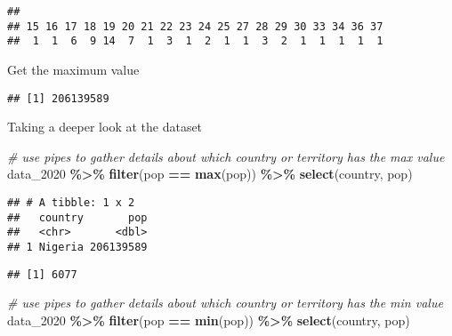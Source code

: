 \documentclass[
]{article}
\newenvironment{Shaded}{\begin{snugshade}}{\end{snugshade}}
\newcommand{\CommentTok}[1]{\textcolor[rgb]{0.56,0.35,0.01}{\textit{#1}}}
\newcommand{\FunctionTok}[1]{\textcolor[rgb]{0.13,0.29,0.53}{\textbf{#1}}}
\newcommand{\NormalTok}[1]{#1}
\newcommand{\SpecialCharTok}[1]{\textcolor[rgb]{0.81,0.36,0.00}{\textbf{#1}}}
\begin{document}
\begin{verbatim}
## 
## 15 16 17 18 19 20 21 22 23 24 25 27 28 29 30 33 34 36 37 
##  1  1  6  9 14  7  1  3  1  2  1  1  3  2  1  1  1  1  1
\end{verbatim}

Get the maximum value

\begin{Shaded}
\end{Shaded}

\begin{verbatim}
## [1] 206139589
\end{verbatim}

Taking a deeper look at the dataset

\begin{Shaded}
\begin{Highlighting}[]
\CommentTok{\# use pipes to gather details about which country or territory has the max value}
\NormalTok{data\_2020 }\SpecialCharTok{\%\textgreater{}\%} 
  \FunctionTok{filter}\NormalTok{(pop }\SpecialCharTok{==} \FunctionTok{max}\NormalTok{(pop)) }\SpecialCharTok{\%\textgreater{}\%} 
  \FunctionTok{select}\NormalTok{(country, pop)}
\end{Highlighting}
\end{Shaded}

\begin{verbatim}
## # A tibble: 1 x 2
##   country       pop
##   <chr>       <dbl>
## 1 Nigeria 206139589
\end{verbatim}

\begin{Shaded}
\end{Shaded}

\begin{verbatim}
## [1] 6077
\end{verbatim}

\begin{Shaded}
\begin{Highlighting}[]
\CommentTok{\# use pipes to gather details about which country or territory has the min value}
\NormalTok{data\_2020 }\SpecialCharTok{\%\textgreater{}\%} 
  \FunctionTok{filter}\NormalTok{(pop }\SpecialCharTok{==} \FunctionTok{min}\NormalTok{(pop)) }\SpecialCharTok{\%\textgreater{}\%} 
  \FunctionTok{select}\NormalTok{(country, pop)}
\end{Highlighting}
\end{Shaded}
\end{document}
